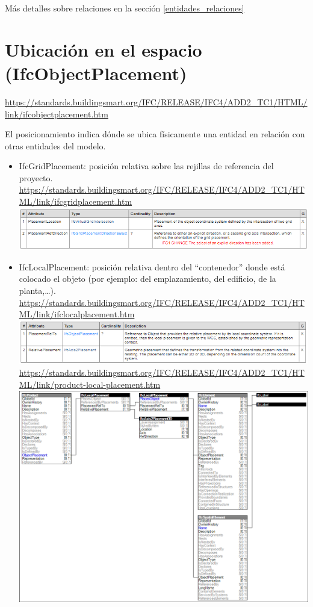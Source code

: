 \documentclass[spanish,12pt,a4paper,final,oneside]{book}
\begin{document}
\vspace{0.5cm}
Más detalles sobre relaciones en la sección \ref{entidades_relaciones}



\section{Ubicación en el espacio (IfcObjectPlacement)}
\url{https://standards.buildingsmart.org/IFC/RELEASE/IFC4/ADD2_TC1/HTML/link/ifcobjectplacement.htm}

El posicionamiento indica dónde se ubica físicamente una entidad en relación con otras entidades del modelo. 

\begin{itemize}

\item IfcGridPlacement: posición relativa sobre las rejillas de referencia del proyecto.
\\ \url{https://standards.buildingsmart.org/IFC/RELEASE/IFC4/ADD2_TC1/HTML/link/ifcgridplacement.htm}
\\ \includegraphics[width=\textwidth]{atributos de IfcGridPlacement}

\item IfcLocalPlacement: posición relativa dentro del ``contenedor'' donde está colocado el objeto (por ejemplo: del emplazamiento, del edificio, de la planta,\ldots).
\\ \url{https://standards.buildingsmart.org/IFC/RELEASE/IFC4/ADD2_TC1/HTML/link/ifclocalplacement.htm}
\\ \includegraphics[width=\textwidth]{atributos de IfcLocalPlacement}
\\ \url{https://standards.buildingsmart.org/IFC/RELEASE/IFC4/ADD2_TC1/HTML/link/product-local-placement.htm}
\\ \includegraphics[width=.9\textwidth]{product-local-placement}



\end{itemize}
\end{document}
